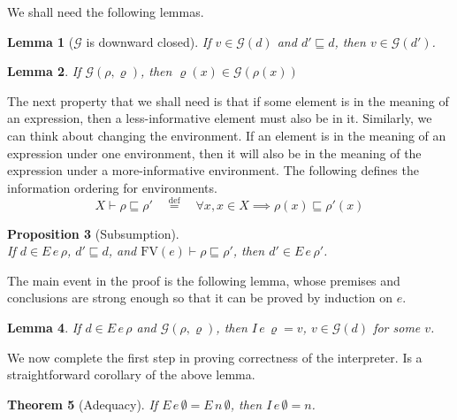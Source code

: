 \documentclass{tufte-handout}
\newcommand{\defeq}[0]{\overset{\mathrm{def}}{=}}
\newtheorem{theorem}{Theorem}%
\newtheorem{lemma}[theorem]{Lemma}
\newtheorem{proposition}[theorem]{Proposition}
\begin{document}
\noindent We shall need the following lemmas.

\begin{lemma}[$\mathcal{G}$ is downward closed]
\label{lem:sub-good}
If $v \in \mathcal{G}(d)$ and $d' \sqsubseteq d$, then $v \in \mathcal{G}(d')$.
\end{lemma}

\begin{lemma}
\label{lem:lookup-good}
  If $\mathcal{G}(\rho,\varrho)$,
  then $\varrho(x) \in \mathcal{G}(\rho(x))$
\end{lemma}

The next property that we shall need is that if some element is in the
meaning of an expression, then a less-informative element must also be
in it. Similarly, we can think about changing the environment.  If an
element is in the meaning of an expression under one environment, then
it will also be in the meaning of the expression under a
more-informative environment. The following defines the information
ordering for environments.
\[
X \vdash \rho \sqsubseteq \rho' \quad\defeq\quad
  \forall x, x \in X \implies \rho(x) \sqsubseteq \rho'(x)
\]

\begin{proposition}[Subsumption]\ \\
  \label{prop:sub}
  If $d \in E\,e\,\rho$, $d' \sqsubseteq d$,
  and $\mathrm{FV}(e) \vdash \rho \sqsubseteq \rho'$,
  then $d' \in E\,e\,\rho'$.
\end{proposition}

The main event in the proof is the following lemma, whose premises and
conclusions are strong enough so that it can be proved by induction on
$e$.

\begin{lemma}
  \label{lem:E-sound-wrt-I}
  If $d \in E\,e\,\rho$ and $\mathcal{G}(\rho,\varrho)$, then
  $I\,e\,\varrho = v$, $v \in \mathcal{G}(d)$ for some $v$.
\end{lemma}

We now complete the first step in proving correctness of the
interpreter. Is a straightforward corollary of the above lemma.

\begin{theorem}[Adequacy]
  \label{thm:E-adequacy}
  If $E\,e\,\emptyset = E\,n\,\emptyset$, then $I\,e\,\emptyset = n$.
\end{theorem}



\end{document}
